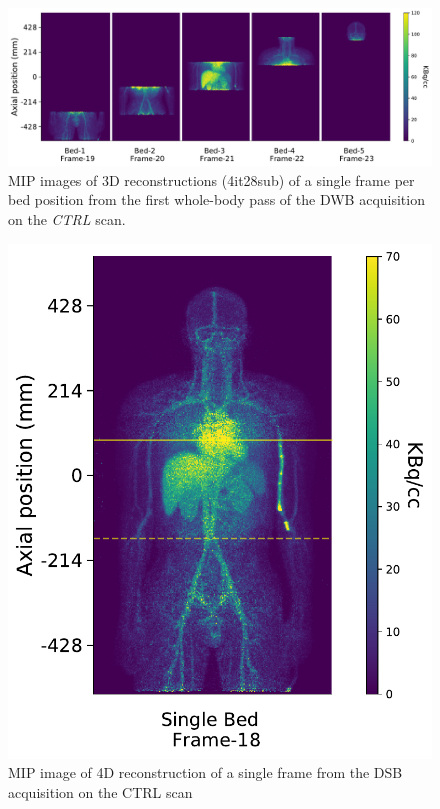 \begin{figure} [h!]
\centering
\includegraphics[scale=0.52,angle=0]{3_Results/3_3_DWB_Reconstruction/figures/3_3_IsotoPK_CTRL_DWB_3D.pdf}
\caption{MIP images of 3D reconstructions (4it28sub) of a single frame per bed position from the first whole-body pass of the DWB acquisition on the \textit{CTRL} scan.}
\label{fig_3_3:IsotoPK_CTRL_DWB_3D}
\end{figure} 

\begin{figure} [h!]
\centering
\includegraphics[scale=0.52,angle=0]{3_Results/3_3_DWB_Reconstruction/figures/3_3_IsotoPK_CTRL_DSB_4D.pdf}
\caption{MIP image of 4D reconstruction of a single frame from the DSB acquisition on the CTRL scan}
\label{fig_3_3:IsotoPK_CTRL_DSB_4D}
\end{figure} 

